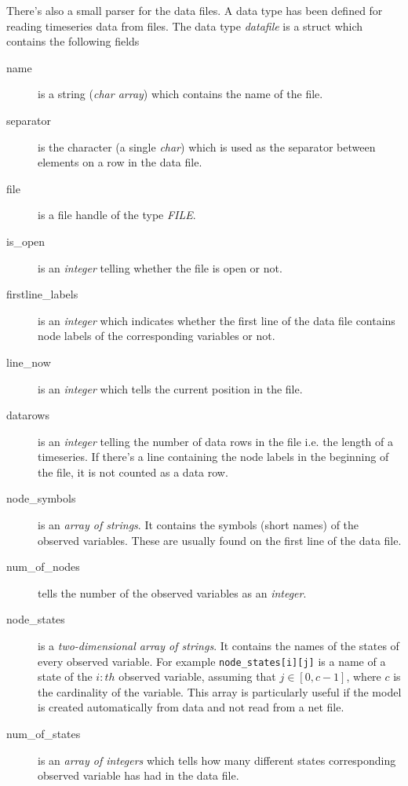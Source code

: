\documentclass[12pt,a4paper]{report}
\begin{document}
There's also a small parser for the data files. A data type has been
defined for reading timeseries data from files. The data type 
{\it datafile} is a struct which contains the following fields
\begin{description}
\item[name] is a string ({\it char array}) which contains the 
name of the file.

\item[separator] is the character (a single {\it char}) which is used 
as the separator between elements on a row in the data file.

\item[file] is a file handle of the type {\it FILE}.

\item[is\_open] is an {\it integer} telling whether the file is open
or not.

\item[firstline\_labels] is an {\it integer} which indicates whether
the first line of the data file contains node labels of the
corresponding variables or not. 

\item[line\_now] is an {\it integer} which tells the current position
in the file.

\item[datarows] is an {\it integer} telling the number of data rows in
the file i.e. the length of a timeseries. If there's a line containing
the node labels in the beginning of the file, it is not counted as a
data row.

\item[node\_symbols] is an {\it array of strings}. It contains the
symbols (short names) of the observed variables. These are usually
found on the first line of the data file.

\item[num\_of\_nodes] tells the number of the observed variables as an
{\it integer}.

\item[node\_states] is a {\it two-dimensional array of strings}. It
contains the names of the states of every observed variable. For
example \verb+node_states[i][j]+ is a name of a state of the $i:th$
observed variable, assuming that $j \in [0, c-1]$, where $c$ is the 
cardinality of the variable. This array is particularly useful if the
model is created automatically from data and not read from a net file.

\item[num\_of\_states] is an {\it array of integers} which tells how
many different states corresponding observed variable has had in the
data file.
\end{description}
\end{document}
